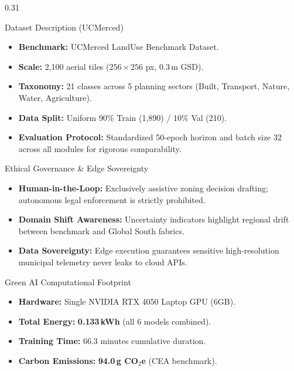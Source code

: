 \documentclass[final]{beamer}
\begin{document}
\begin{frame}[t]
\begin{columns}[t]
\begin{column}{0.31\textwidth}
    \begin{block}{Dataset Description (UCMerced)}
      \begin{itemize}
        \item \textbf{Benchmark:} UCMerced LandUse Benchmark Dataset.
        \item \textbf{Scale:} 2,100 aerial tiles ($256 \times 256$ px, 0.3\,m GSD).
        \item \textbf{Taxonomy:} 21 classes across 5 planning sectors (Built, Transport, Nature, Water, Agriculture).
        \item \textbf{Data Split:} Uniform 90\% Train (1,890) / 10\% Val (210).
        \item \textbf{Evaluation Protocol:} Standardized 50-epoch horizon and batch size 32 across all modules for rigorous comparability.
      \end{itemize}
    \end{block}

    \begin{block}{Ethical Governance \& Edge Sovereignty}
      \begin{itemize}
        \item \textbf{Human-in-the-Loop:} Exclusively assistive zoning decision drafting; autonomous legal enforcement is strictly prohibited.
        \item \textbf{Domain Shift Awareness:} Uncertainty indicators highlight regional drift between benchmark and Global South fabrics.
        \item \textbf{Data Sovereignty:} Edge execution guarantees sensitive high-resolution municipal telemetry never leaks to cloud APIs.
      \end{itemize}
    \end{block}

    \begin{block}{Green AI Computational Footprint}
      \begin{itemize}
        \item \textbf{Hardware:} Single NVIDIA RTX 4050 Laptop GPU (6GB).
        \item \textbf{Total Energy:} \textbf{0.133\,kWh} (all 6 models combined).
        \item \textbf{Training Time:} 66.3 minutes cumulative duration.
        \item \textbf{Carbon Emissions:} \textbf{94.0\,g CO$_2$e} (CEA benchmark).
      \end{itemize}
    \end{block}


\end{column}
\end{columns}
\end{frame}
\end{document}
